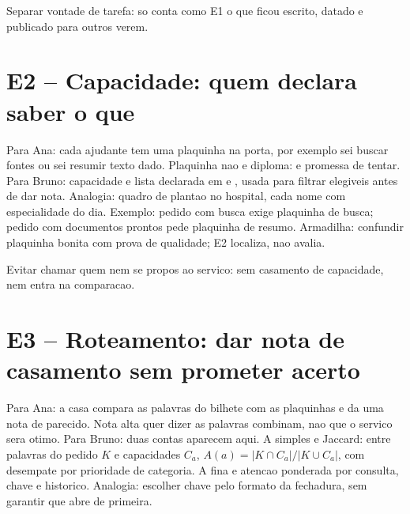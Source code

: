 \begin{funcao}
Separar vontade de tarefa: so conta como E1 o que ficou escrito, datado e publicado para outros verem.
\end{funcao}

\section{E2 -- Capacidade: quem declara saber o que}


\begin{descricao}
Para Ana: cada ajudante tem uma plaquinha na porta, por exemplo sei buscar fontes ou sei resumir texto dado. Plaquinha nao e diploma: e promessa de tentar. Para Bruno: capacidade e lista declarada em  e , usada para filtrar elegiveis antes de dar nota. Analogia: quadro de plantao no hospital, cada nome com especialidade do dia. Exemplo: pedido com busca exige plaquinha de busca; pedido com documentos prontos pede plaquinha de resumo. Armadilha: confundir plaquinha bonita com prova de qualidade; E2 localiza, nao avalia.
\end{descricao}

\begin{funcao}
Evitar chamar quem nem se propos ao servico: sem casamento de capacidade, nem entra na comparacao.
\end{funcao}

\section{E3 -- Roteamento: dar nota de casamento sem prometer acerto}


\begin{descricao}
Para Ana: a casa compara as palavras do bilhete com as plaquinhas e da uma nota de parecido. Nota alta quer dizer as palavras combinam, nao que o servico sera otimo. Para Bruno: duas contas aparecem aqui. A simples e Jaccard: entre palavras do pedido $K$ e capacidades $C_{a}$, $A(a) = |K \cap C_{a}|/|K \cup C_{a}|$, com desempate por prioridade de categoria. A fina e atencao ponderada por consulta, chave e historico. Analogia: escolher chave pelo formato da fechadura, sem garantir que abre de primeira.
\end{descricao}

